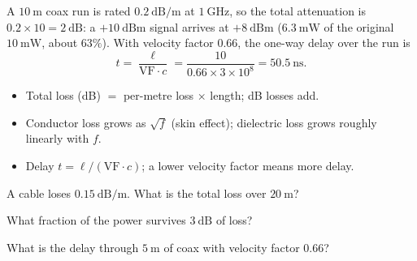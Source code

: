 \begin{workedexample}
A $10\ \text{m}$ coax run is rated $0.2\ \text{dB/m}$ at $1\ \text{GHz}$,
so the total attenuation is $0.2\times10 = 2\ \text{dB}$: a $+10\ \text{dBm}$
signal arrives at $+8\ \text{dBm}$ ($6.3\ \text{mW}$ of the original $10\ \text{mW}$,
about $63\%$). With velocity factor $0.66$, the one-way delay over the run is
\[ t = \frac{\ell}{\text{VF}\cdot c} = \frac{10}{0.66\times3\times10^{8}} = 50.5\ \text{ns}. \]
\end{workedexample}

\begin{keytakeaways}
\begin{itemize}[leftmargin=1.4em,itemsep=2pt]
\item Total loss (dB) $=$ per-metre loss $\times$ length; dB losses add.
\item Conductor loss grows as $\sqrt{f}$ (skin effect); dielectric loss grows roughly linearly with $f$.
\item Delay $t = \ell/(\text{VF}\cdot c)$; a lower velocity factor means more delay.
\end{itemize}
\end{keytakeaways}

\begin{exercises}
\item A cable loses $0.15\ \text{dB/m}$. What is the total loss over $20\ \text{m}$?
\item What fraction of the power survives $3\ \text{dB}$ of loss?
\item What is the delay through $5\ \text{m}$ of coax with velocity factor $0.66$?
\end{exercises}

